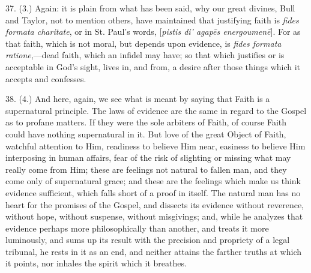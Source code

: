 37. (3.) Again: it is plain from what has been said, why our great
divines, Bull and Taylor, not to mention others, have maintained that
justifying faith is \emph{fides formata charitate}, or in St. Paul's
words, [\emph{pistis di' agap\={e}s
energoumen\={e}}].
For as that faith, which is not moral, but depends upon evidence, is \emph{fides
formata ratione},—dead faith, which an infidel may have; so that
which justifies or is acceptable in God's sight, lives in, and from, a
desire after those things which it accepts and confesses.

38. (4.) And here, again, we see what is meant by saying that Faith
is a supernatural principle. The laws of evidence are the same in
regard to the Gospel as to profane matters. If they were the sole
arbiters of Faith, of course Faith could have nothing supernatural in
it. But love of the great Object of Faith, watchful attention to Him,
readiness to believe Him near, easiness to believe Him interposing in
human affairs, fear of the risk of slighting or missing what may
really come from Him; these are feelings not natural to fallen man,
and they come only of supernatural grace; and these are the feelings
which make us think evidence sufficient, which falls short of a proof
in itself. The natural man has no heart for the promises of the
Gospel, and dissects its evidence without reverence, without hope,
without suspense, without misgivings; and, while he analyzes that
evidence perhaps more philosophically than another, and treats it more
luminously, and sums up its result with the precision and propriety of
a legal tribunal, he rests in it as an end, and neither attains the
farther truths at which it points, nor inhales the spirit which it
breathes.

